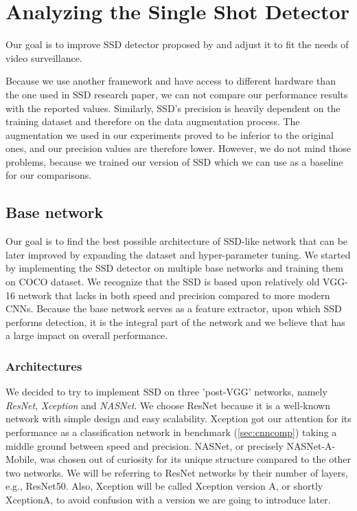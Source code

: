 \chapter{Analyzing the Single Shot Detector}


Our goal is to improve SSD detector proposed by \citeauthor{bib:ssd} and adjust it to fit the needs of video surveillance.  

Because we use another framework and have access to different hardware than the one used in SSD research paper, we can not compare our performance results with the reported values. Similarly, SSD's precision is heavily dependent on the training dataset and therefore on the data augmentation process. The augmentation we used in our experiments proved to be inferior to the original ones, and our precision values are therefore lower. However, we do not mind those problems, because we trained our version of SSD which we can use as a baseline for our comparisons. 





\section{Base network}
Our goal is to find the best possible architecture of SSD-like network that can be later improved by expanding the dataset and hyper-parameter tuning. We started by implementing the SSD detector on multiple base networks and training them on COCO dataset. We recognize that the SSD is based upon relatively old VGG-16 network that lacks in both speed and precision compared to more modern CNNs. Because the base network serves as a feature extractor, upon which SSD performs detection, it is the integral part of the network and we believe that has a large impact on overall performance. 

\subsection{Architectures}
We decided to try to implement SSD on three 'post-VGG' networks, namely \textit{ResNet}, \textit{Xception} and \textit{NASNet}. We choose ResNet because it is a well-known network with simple design and easy scalability. Xception got our attention for its performance as a classification network in \citeauthor{bib:cnnbenchmark} benchmark (\cref{sec:cnncomp}) taking a middle ground between speed and precision. NASNet, or precisely NASNet-A-Mobile, was chosen out of curiosity for its unique structure compared to the other two networks. We will be referring to ResNet networks by their number of layers, e.g., ResNet50. Also, Xception will be called Xception version A, or shortly XceptionA, to avoid confusion with a version we are going to introduce later.

